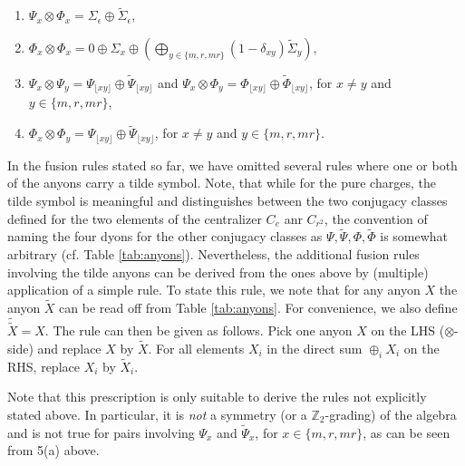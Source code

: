 \documentclass[a4paper,twocolumn,11pt, accepted=2024-06-14]{quantumarticle}
\begin{document}
\begin{enumerate}
\begin{enumerate}
		\item $\Psi_x \otimes \Phi_x = \Sigma_\epsilon \oplus \tilde\Sigma_\epsilon$,
		\item $\Phi_x \otimes \Phi_x = 0 \oplus \Sigma_x \oplus (\bigoplus_{y \in \{m, r, mr\}}(1-\delta_{xy})\tilde\Sigma_y)$,
		\item $\Psi_x \otimes \Psi_y = \Psi_{\lfloor xy \rfloor} \oplus \tilde\Psi_{\lfloor xy \rfloor}$ and $\Psi_x \otimes \Phi_y = \Phi_{\lfloor xy \rfloor} \oplus \tilde\Phi_{\lfloor xy \rfloor}$, for $x \neq y$ and $y \in \{m, r, mr\}$,
		\item $\Phi_x \otimes \Phi_y  = \Psi_{\lfloor xy \rfloor} \oplus \tilde\Psi_{\lfloor xy \rfloor}$, for $x \neq y$ and $y \in \{m, r, mr\}$.
\end{enumerate}
\end{enumerate}
In the fusion rules stated so far, we have omitted several rules where one or both of the anyons carry a tilde symbol. Note, that while for the pure charges, the tilde symbol is meaningful and distinguishes between the two conjugacy classes defined for the two elements of the centralizer $C_e$ anr $C_{r^2}$, the convention of naming the four dyons for the other conjugacy classes as $\Psi,\tilde \Psi,\Phi,\tilde \Phi$ is somewhat arbitrary (cf. Table \ref{tab:anyons}). Nevertheless, the additional fusion rules involving the tilde anyons can be derived from the ones above by (multiple) application of a simple rule. To state this rule, we note that for any anyon $X$ the anyon $\tilde X$ can be read off from Table \ref{tab:anyons}. For convenience, we also define $\tilde{\tilde X}=X$. The rule can then be given as follows. Pick one anyon $X$ on the LHS ($\otimes$-side) and replace $X$ by $\tilde X$. For all elements $X_i$ in the direct sum $\oplus_i X_i$ on the RHS, replace $X_i$ by $\tilde X_i$.	
 
Note that this prescription is only suitable to derive the rules not explicitly stated above. In particular, it is \emph{not} a symmetry (or a $\mathbb{Z}_2$-grading) of the algebra and is not true for pairs involving $\Psi_x$ and $\tilde\Psi_x$, for $x \in \{m, r, mr\}$, as can be seen from 5(a) above.
\end{document}
